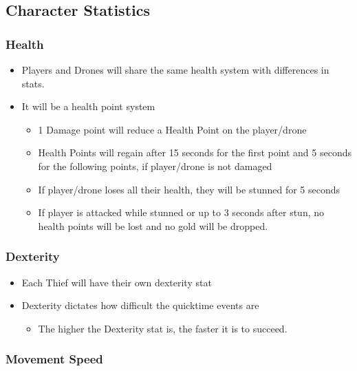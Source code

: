 \documentclass[10pt]{report}
\begin{document}
\subsection{Character Statistics}

\subsubsection{Health}

\begin{itemize}
    \item Players and Drones will share the same health system with differences in stats.
    \item It will be a health point system
    \begin{itemize}
        \item 1 Damage point will reduce a Health Point on the player/drone
        \item Health Points will regain after 15 seconds for the first point and 5 seconds for the following points, if player/drone is not damaged
        \item If player/drone loses all their health, they will be stunned for 5 seconds
        \item If player is attacked while stunned or up to 3 seconds after stun, no health points will be lost and no gold will be dropped.    
    \end{itemize}
\end{itemize}

\subsubsection{Dexterity}

\begin{itemize}
    \item Each Thief will have their own dexterity stat
    \item Dexterity dictates how difficult the quicktime events are
    \begin{itemize}
        \item The higher the Dexterity stat is, the faster it is to succeed.    
    \end{itemize}
\end{itemize}

\subsubsection{Movement Speed}
\end{document}

